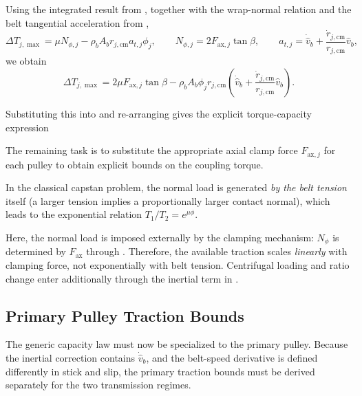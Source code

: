 \documentclass[11pt]{article}
\numberwithin{equation}{section}
\begin{document}
Using the integrated result from ,
together with the wrap-normal relation  and the
belt tangential acceleration from ,
\[
\Delta T_{j,\max}
=
\mu N_{\phi,j}
-
\rho_b A_b r_{j,\mathrm{cm}} a_{t,j} \phi_j,
\qquad
N_{\phi,j} = 2F_{\mathrm{ax},j}\tan\beta,
\qquad
a_{t,j}
=
\dot{\hat v}_b
+
\frac{\dot r_{j,\mathrm{cm}}}{r_{j,\mathrm{cm}}}\hat v_b,
\]
we obtain
\begin{equation}
\Delta T_{j,\max}
=
2\mu F_{\mathrm{ax},j}\tan\beta
-
\rho_b A_b \phi_j r_{j,\mathrm{cm}}
\left(
\dot{\hat v}_b
+
\frac{\dot r_{j,\mathrm{cm}}}{r_{j,\mathrm{cm}}}\hat v_b
\right).
\label{eq:deltaT_max_explicit}
\end{equation}

Substituting this into  and re-arranging gives the explicit
torque-capacity expression


The remaining task is to substitute the appropriate axial clamp force
\(F_{\mathrm{ax},j}\) for each pulley to obtain explicit bounds on the
coupling torque.

\begin{remarkbox}
In the classical capstan problem, the normal load is generated \emph{by the belt tension}
itself (a larger tension implies a proportionally larger contact normal),
which leads to the exponential relation $T_1/T_2 = e^{\mu\phi}$.

Here, the normal load is imposed externally by the clamping mechanism:
$N_\phi$ is determined by $F_{\mathrm{ax}}$ through .
Therefore, the available traction scales \emph{linearly} with clamping force,
not exponentially with belt tension.
Centrifugal loading and ratio change enter additionally through the inertial term
in .
\end{remarkbox}

\subsection{Primary Pulley Traction Bounds}
\label{sec:primary_tau_limits}

The generic capacity law  must now be specialized to
the primary pulley.
Because the inertial correction contains \(\dot{\hat v}_b\), and the belt-speed
derivative is defined differently in stick and slip, the primary traction bounds
must be derived separately for the two transmission regimes.
\end{document}
